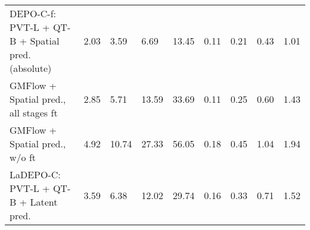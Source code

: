 \begin{table}[h!]
\begin{tabular}{lllllllll}
DEPO-C-f: PVT-L + QT-B + Spatial pred. (absolute) & {\cellcolor[HTML]{006837}} \color[HTML]{F1F1F1} 2.03 & {\cellcolor[HTML]{006837}} \color[HTML]{F1F1F1} 3.59 & {\cellcolor[HTML]{006837}} \color[HTML]{F1F1F1} 6.69 & {\cellcolor[HTML]{006837}} \color[HTML]{F1F1F1} 13.45 & {\cellcolor[HTML]{08773F}} \color[HTML]{F1F1F1} 0.11 & {\cellcolor[HTML]{006837}} \color[HTML]{F1F1F1} 0.21 & {\cellcolor[HTML]{006837}} \color[HTML]{F1F1F1} 0.43 & {\cellcolor[HTML]{006837}} \color[HTML]{F1F1F1} 1.01 \\
GMFlow + Spatial pred., all stages ft & {\cellcolor[HTML]{45AD5B}} \color[HTML]{F1F1F1} 2.85 & {\cellcolor[HTML]{6BBF64}} \color[HTML]{000000} 5.71 & {\cellcolor[HTML]{B3DF72}} \color[HTML]{000000} 13.59 & {\cellcolor[HTML]{EFF8AA}} \color[HTML]{000000} 33.69 & {\cellcolor[HTML]{006837}} \color[HTML]{F1F1F1} 0.11 & {\cellcolor[HTML]{1E9A51}} \color[HTML]{F1F1F1} 0.25 & {\cellcolor[HTML]{84CA66}} \color[HTML]{000000} 0.60 & {\cellcolor[HTML]{E9F6A1}} \color[HTML]{000000} 1.43 \\
GMFlow + Spatial pred., w/o ft & {\cellcolor[HTML]{FEEC9F}} \color[HTML]{000000} 4.92 & {\cellcolor[HTML]{FCA85E}} \color[HTML]{000000} 10.74 & {\cellcolor[HTML]{AF0926}} \color[HTML]{F1F1F1} 27.33 & {\cellcolor[HTML]{B71126}} \color[HTML]{F1F1F1} 56.05 & {\cellcolor[HTML]{EBF7A3}} \color[HTML]{000000} 0.18 & {\cellcolor[HTML]{FDC372}} \color[HTML]{000000} 0.45 & {\cellcolor[HTML]{D42D27}} \color[HTML]{F1F1F1} 1.04 & {\cellcolor[HTML]{AF0926}} \color[HTML]{F1F1F1} 1.94 \\
LaDEPO-C: PVT-L + QT-B + Latent pred. & {\cellcolor[HTML]{A7D96B}} \color[HTML]{000000} 3.59 & {\cellcolor[HTML]{96D268}} \color[HTML]{000000} 6.38 & {\cellcolor[HTML]{87CB67}} \color[HTML]{000000} 12.02 & {\cellcolor[HTML]{C9E881}} \color[HTML]{000000} 29.74 & {\cellcolor[HTML]{BFE47A}} \color[HTML]{000000} 0.16 & {\cellcolor[HTML]{B3DF72}} \color[HTML]{000000} 0.33 & {\cellcolor[HTML]{DAF08D}} \color[HTML]{000000} 0.71 & {\cellcolor[HTML]{FFF3AC}} \color[HTML]{000000} 1.52 \\
\bottomrule
\end{tabular}
\end{table}
